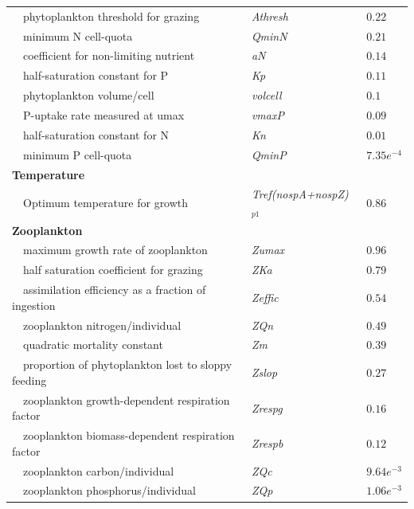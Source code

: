 \documentclass[review]{elsarticle}\usepackage[]{graphicx}\usepackage[]{color}
\begin{document}
\begin{table}[!tbp]
{\begin{center}
\begin{tabular}{lll}
~~phytoplankton threshold for grazing&\textit{Athresh}&$0.22$\tabularnewline
~~minimum N cell-quota&\textit{QminN}&$0.21$\tabularnewline
~~coefficient for non-limiting nutrient&\textit{aN}&$0.14$\tabularnewline
~~half-saturation constant for P&\textit{Kp}&$0.11$\tabularnewline
~~phytoplankton volume/cell&\textit{volcell}&$0.1$\tabularnewline
~~P-uptake rate measured at umax&\textit{vmaxP}&$0.09$\tabularnewline
~~half-saturation constant for N&\textit{Kn}&$0.01$\tabularnewline
~~minimum P cell-quota&\textit{QminP}&$7.35e^{-4}$\tabularnewline
\hline
{\bfseries Temperature}&&\tabularnewline
~~Optimum temperature for growth&\textit{Tref(nospA+nospZ)$_{p1}$}&$0.86$\tabularnewline
\hline
{\bfseries Zooplankton}&&\tabularnewline
~~maximum growth rate of zooplankton&\textit{Zumax}&$0.96$\tabularnewline
~~half saturation coefficient for grazing&\textit{ZKa}&$0.79$\tabularnewline
~~assimilation efficiency as a fraction of ingestion&\textit{Zeffic}&$0.54$\tabularnewline
~~zooplankton nitrogen/individual&\textit{ZQn}&$0.49$\tabularnewline
~~quadratic mortality constant&\textit{Zm}&$0.39$\tabularnewline
~~proportion of phytoplankton lost to sloppy feeding&\textit{Zslop}&$0.27$\tabularnewline
~~zooplankton growth-dependent respiration factor&\textit{Zrespg}&$0.16$\tabularnewline
~~zooplankton biomass-dependent respiration factor&\textit{Zrespb}&$0.12$\tabularnewline
~~zooplankton carbon/individual&\textit{ZQc}&$9.64e^{-3}$\tabularnewline
~~zooplankton phosphorus/individual&\textit{ZQp}&$1.06e^{-3}$\tabularnewline
\hline
\end{tabular}\end{center}}
\end{table}
\end{document}
